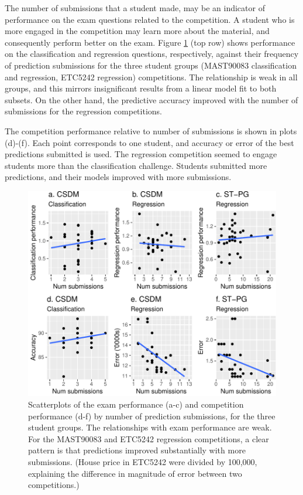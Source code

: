 \documentclass[12pt]{article}
\begin{document}
The number of submissions that a student made, may be an indicator of
performance on the exam questions related to the competition. A student
who is more engaged in the competition may learn more about the
material, and consequently perform better on the exam. Figure
\ref{fig:numsubmition} (top row) shows performance on the classification
and regression questions, respectively, against their frequency of
prediction submissions for the three student groups (MAST90083
classification and regression, ETC5242 regression) competitions. The
relationship is weak in all groups, and this mirrors insignificant
results from a linear model fit to both subsets. On the other hand, the
predictive accuracy improved with the number of submissions for the
regression competitions.

The competition performance relative to number of submissions is shown
in plots (d)-(f). Each point corresponds to one student, and accuracy or
error of the best predictions submitted is used. The regression
competition seemed to engage students more than the classification
challenge. Students submitted more predictions, and their models
improved with more submissions.

\begin{figure}
\centering
\includegraphics{paper-kaggle_files/figure-latex/numsubmition-1.pdf}
\caption{\label{fig:numsubmition} Scatterplots of the exam performance
(a-c) and competition performance (d-f) by number of prediction
submissions, for the three student groups. The relationships with exam
performance are weak. For the MAST90083 and ETC5242 regression
competitions, a clear pattern is that predictions improved substantially
with more submissions. (House price in ETC5242 were divided by 100,000,
explaining the difference in magnitude of error between two
competitions.)}
\end{figure}
\end{document}
